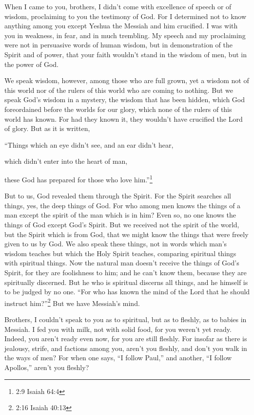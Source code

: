 \mychapter{} \myverse*{}When I came to you, brothers, I didn’t come with excellence of
speech or of wisdom, proclaiming to you the testimony of God.
\myverse{}For I determined not to know anything among you except Yeshua the Messiah and
him crucified.
\myverse{}I was with you in weakness, in fear, and in much trembling.
\myverse{}My speech and my proclaiming were not in persuasive words of human wisdom, but
in demonstration of the Spirit and of power,
\myverse{}that your faith wouldn’t stand in the wisdom of men, but in the power of God.

\myverse{}We speak wisdom, however, among those who are full grown, yet a
wisdom not of this world nor of the rulers of this world who are coming to nothing.
\myverse{}But we speak God’s wisdom in a mystery, the wisdom that has been hidden, which
God foreordained before the worlds for our glory,
\myverse{}which none of the rulers of this world has known. For had they known it, they
wouldn’t have crucified the Lord of glory.
\myverse{}But as it is written,

“Things which an eye didn’t see, and an ear didn’t hear,

which didn’t enter into the heart of man,

these God has prepared for those who love him.”\footnote{2:9 Isaiah 64:4}

\myverse{}But to us, God revealed them through the Spirit. For the Spirit
searches all things, yes, the deep things of God.
\myverse{}For who among men knows the things of a man except the spirit of the man which
is in him? Even so, no one knows the things of God except God’s Spirit.
\myverse{}But we received not the spirit of the world, but the Spirit which is from
God, that we might know the things that were freely given to us by God.
\myverse{}We also speak these things, not in words which man’s wisdom teaches but which
the Holy Spirit teaches, comparing spiritual things with spiritual things.
\myverse{}Now the natural man doesn’t receive the things of God’s Spirit, for they are
foolishness to him; and he can’t know them, because they are spiritually discerned.
\myverse{}But he who is spiritual discerns all things, and he himself is to be judged
by no one.
\myverse{}“For who has known the mind of the Lord that he should instruct him?”\footnote{2:16 Isaiah 40:13} But we have Messiah’s mind.


\mychapter{} \myverse*{}Brothers, I couldn’t speak to you as to spiritual, but as to fleshly,
as to babies in Messiah.
\myverse{}I fed you with milk, not with solid food, for you weren’t yet ready. Indeed,
you aren’t ready even now,
\myverse{}for you are still fleshly. For insofar as there is jealousy, strife, and factions
among you, aren’t you fleshly, and don’t you walk in the ways of men?
\myverse{}For when one says, “I follow Paul,” and another, “I follow Apollos,” aren’t
you fleshly?

